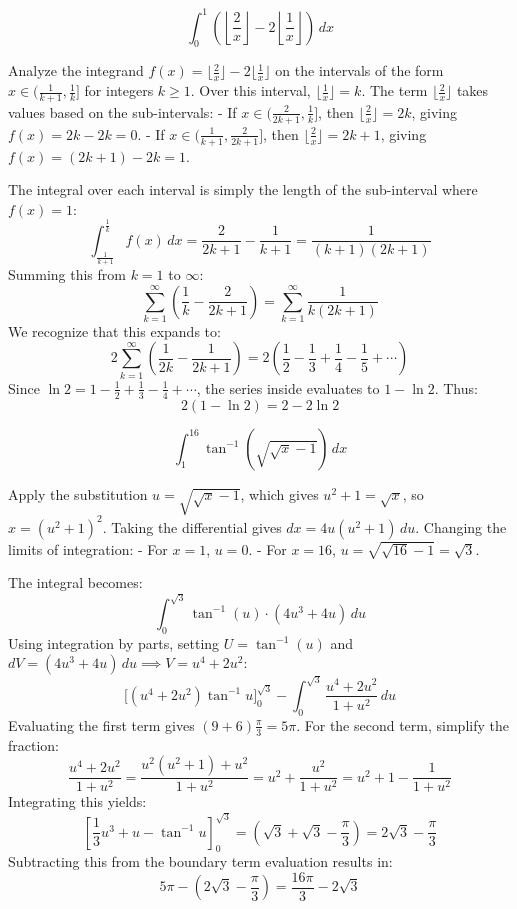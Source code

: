 \begin{questions}
\question
\[ \int_{0}^{1} \left( \left\lfloor \frac{2}{x} \right\rfloor - 2 \left\lfloor \frac{1}{x} \right\rfloor \right) \,dx \]
\begin{solution}
Analyze the integrand $f(x) = \lfloor \frac{2}{x} \rfloor - 2 \lfloor \frac{1}{x} \rfloor$ on the intervals of the form $x \in (\frac{1}{k+1}, \frac{1}{k}]$ for integers $k \ge 1$. Over this interval, $\lfloor \frac{1}{x} \rfloor = k$. 
The term $\lfloor \frac{2}{x} \rfloor$ takes values based on the sub-intervals:
- If $x \in (\frac{2}{2k+1}, \frac{1}{k}]$, then $\lfloor \frac{2}{x} \rfloor = 2k$, giving $f(x) = 2k - 2k = 0$.
- If $x \in (\frac{1}{k+1}, \frac{2}{2k+1}]$, then $\lfloor \frac{2}{x} \rfloor = 2k+1$, giving $f(x) = (2k+1) - 2k = 1$.

The integral over each interval is simply the length of the sub-interval where $f(x) = 1$:
\[ \int_{\frac{1}{k+1}}^{\frac{1}{k}} f(x) \,dx = \frac{2}{2k+1} - \frac{1}{k+1} = \frac{1}{(k+1)(2k+1)} \]
Summing this from $k = 1$ to $\infty$:
\[ \sum_{k=1}^{\infty} \left( \frac{1}{k} - \frac{2}{2k+1} \right) = \sum_{k=1}^{\infty} \frac{1}{k(2k+1)} \]
We recognize that this expands to:
\[ 2 \sum_{k=1}^{\infty} \left( \frac{1}{2k} - \frac{1}{2k+1} \right) = 2 \left( \frac{1}{2} - \frac{1}{3} + \frac{1}{4} - \frac{1}{5} + \cdots \right) \]
Since $\ln 2 = 1 - \frac{1}{2} + \frac{1}{3} - \frac{1}{4} + \cdots$, the series inside evaluates to $1 - \ln 2$. Thus:
\[ 2(1 - \ln 2) = 2 - 2\ln 2 \]
\end{solution}

\question
\[ \int_{1}^{16} \tan^{-1} \left( \sqrt{\sqrt{x} - 1} \right) \,dx \]
\begin{solution}
Apply the substitution $u = \sqrt{\sqrt{x} - 1}$, which gives $u^2 + 1 = \sqrt{x}$, so $x = (u^2 + 1)^2$. Taking the differential gives $dx = 4u(u^2 + 1) \,du$.
Changing the limits of integration:
- For $x = 1$, $u = 0$.
- For $x = 16$, $u = \sqrt{\sqrt{16}-1} = \sqrt{3}$.

The integral becomes:
\[ \int_{0}^{\sqrt{3}} \tan^{-1}(u) \cdot (4u^3 + 4u) \,du \]
Using integration by parts, setting $U = \tan^{-1}(u)$ and $dV = (4u^3 + 4u) \,du \implies V = u^4 + 2u^2$:
\[ \Big[ (u^4 + 2u^2) \tan^{-1} u \Big]_{0}^{\sqrt{3}} - \int_{0}^{\sqrt{3}} \frac{u^4 + 2u^2}{1 + u^2} \,du \]
Evaluating the first term gives $(9 + 6)\frac{\pi}{3} = 5\pi$. For the second term, simplify the fraction:
\[ \frac{u^4 + 2u^2}{1 + u^2} = \frac{u^2(u^2 + 1) + u^2}{1 + u^2} = u^2 + \frac{u^2}{1 + u^2} = u^2 + 1 - \frac{1}{1 + u^2} \]
Integrating this yields:
\[ \left[ \frac{1}{3}u^3 + u - \tan^{-1} u \right]_{0}^{\sqrt{3}} = \left( \sqrt{3} + \sqrt{3} - \frac{\pi}{3} \right) = 2\sqrt{3} - \frac{\pi}{3} \]
Subtracting this from the boundary term evaluation results in:
\[ 5\pi - \left( 2\sqrt{3} - \frac{\pi}{3} \right) = \frac{16\pi}{3} - 2\sqrt{3} \]
\end{solution}

\end{questions}

